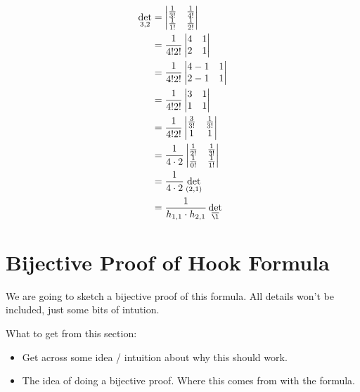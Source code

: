 \documentclass{article}
\begin{document}
\begin{align*}
  \det_{3, 2} &= \left| \begin{matrix}
    \frac{1}{3!} & \frac{1}{4!}\\
    \frac{1}{1!} & \frac{1}{2!}
  \end{matrix} \right|\\
  &= \frac{1}{4!2!} \left| \begin{matrix}
    4 & 1 \\
    2 & 1
  \end{matrix} \right|\\
  &= \frac{1}{4!2!}\left| \begin{matrix}
    4-1 & 1 \\
    2-1 & 1
  \end{matrix} \right|\\
  &= \frac{1}{4!2!}\left| \begin{matrix}
    3 & 1 \\
    1 & 1
  \end{matrix} \right|\\
  &= \frac{1}{4!2!}\left| \begin{matrix}
    \frac{3}{3!} & \frac{1}{3!} \\
    1 & 1
  \end{matrix} \right|\\
  &= \frac{1}{4 \cdot 2}\left| \begin{matrix}
    \frac{1}{2!} & \frac{1}{3!} \\
    \frac{1}{0!} & \frac{1}{1!}
  \end{matrix} \right|\\
  &= \frac{1}{4 \cdot 2} \det_{(2, 1)}\\
  &= \frac{1}{h_{1, 1} \cdot h_{2, 1}}\det_{\overline{\l}}
\end{align*}

\section{Bijective Proof of Hook Formula}
We are going to sketch a bijective proof of this formula. All details won't be included, just some bits of intution.

What to get from this section:
\begin{itemize}
  \item Get across some idea / intuition about why this should work.
  \item The idea of doing a bijective proof. Where this comes from with the formula.
\end{itemize}
\end{document}
